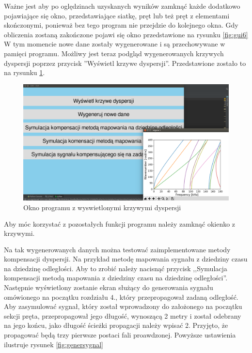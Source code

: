 Ważne jest aby po oględzinach uzyskanych wyników zamknąć każde dodatkowo pojawiające się okno, przedstawiające siatkę, pręt lub też pręt z elementami skończonymi, ponieważ bez tego program nie przejdzie do kolejnego okna. Gdy obliczenia zostaną zakończone pojawi się okno przedstawione na rysunku \ref{fig:gui6} W tym momencie nowe dane zostały wygenerowane i są przechowywane w pamięci programu. Możliwy jest teraz podgląd wygenerowanych krzywych dyspersji poprzez przycisk ''Wyświetl krzywe dyspersji''. Przedstawione zostało to na rysunku \ref{fig:krzywesa}.

\begin{figure}[h]
\centering
\includegraphics[width=13cm]{Zdjecia/5/kasia/krzywesa}
\caption{Okno programu z wyswietlonymi krzywymi dyspersji}
\label{fig:krzywesa}
\end{figure}

Aby móc korzystać z pozostałych funkcji programu należy zamknąć okienko z krzywymi.

Na tak wygenerowanych danych można testować zaimplementowane metody kompensacji dyspersji. Na przykład metodę mapowania sygnału z dziedziny czasu na dziedzinę odległości. Aby to zrobić należy nacisnąć przycisk ,,Symulacja kompensacji metodą mapowania z dziedziny czasu na dziedzinę odległości''. Następnie wyświetlony zostanie ekran służący do generowania sygnału omówionego na początku rozdziału 4., który przepropagował zadaną odległość. Aby zasymulować sygnał, który został wprowadzony do założonego na początku sekcji pręta, przepropagował jego długość, wynoszącą 2 metry i został odebrany na jego końcu, jako długość ścieżki propagacji należy wpisać 2. Przyjęto, że propagować będą trzy pierwsze postaci fali proawdzonej. Powyższe ustawienia ilustruje rysunek \ref{fig:genersygnal}

